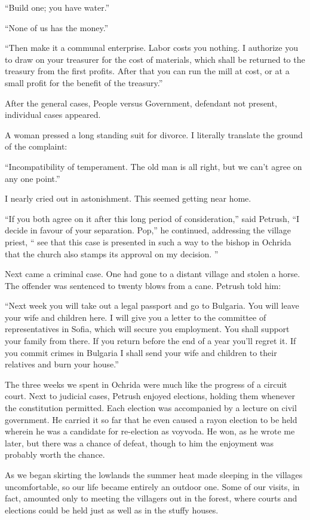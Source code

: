 \documentclass[a5paper,12pt]{book}
\begin{document}
“Build one; you have water.”

“None of us has the money.”

“Then make it a communal enterprise. Labor costs you nothing. I authorize you to draw on your treasurer for the cost of materials, which shall be returned to the treasury from the first profits. After that you can run the mill at cost, or at a small profit for the benefit of the treasury.”

After the general cases, People versus Government, defendant not present, individual cases appeared.

A woman pressed a long standing suit for divorce. I literally translate the ground of the complaint:

“Incompatibility of temperament. The old man is all right, but we can’t agree on any one point.”

I nearly cried out in astonishment. This seemed getting near home.

“If you both agree on it after this long period of consideration,” said Petrush, “I decide in favour of your separation. Pop,” he continued, addressing the village priest, “ see that this case is presented in such a way to the bishop in Ochrida that the church also stamps its approval on my decision. ”

Next came a criminal case. One had gone to a distant village and stolen a horse. The offender was sentenced to twenty blows from a cane. Petrush told him:

“Next week you will take out a legal passport and go to Bulgaria. You will leave your wife and children here. I will give you a letter to the committee of representatives in Sofia, which will secure you employment. You shall support your family from there. If you return before the end of a year you’ll regret it. If you commit crimes in Bulgaria I shall send your wife and children to their relatives and burn your house.”

The three weeks we spent in Ochrida were much like the progress of a circuit court. Next to judicial cases, Petrush enjoyed elections, holding them whenever the constitution permitted. Each election was accompanied by a lecture on civil government.
He carried it so far that he even caused a rayon election to be held wherein he was a candidate for re-election as voyvoda. He won, as he wrote me later, but there was a chance of defeat, though to him the enjoyment was probably worth the chance. 

As we began skirting the lowlands the summer heat made sleeping in the villages uncomfortable, so our life became entirely an outdoor one. Some of our visits, in fact, amounted only to meeting the villagers out in the forest, where courts and elections could be held just as well as in the stuffy houses. 
\end{document}
